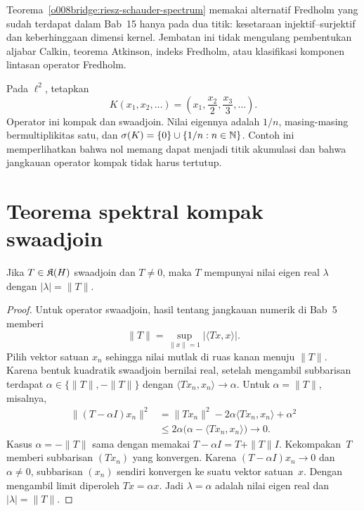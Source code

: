 \begin{rem}\label{o008bridge:no-fredholm-duplication}
Teorema~\ref{o008bridge:riesz-schauder-spectrum} memakai alternatif Fredholm
yang sudah terdapat dalam Bab~15 hanya pada dua titik: kesetaraan
injektif--surjektif dan keberhinggaan dimensi kernel. Jembatan ini tidak
mengulang pembentukan aljabar Calkin, teorema Atkinson, indeks Fredholm, atau
klasifikasi komponen lintasan operator Fredholm.
\end{rem}

\begin{exam}\label{o008bridge:diagonal-compact-example}
Pada $\ell^2$, tetapkan
\[
 K(x_1,x_2,\ldots)=
   \left(x_1,\frac{x_2}{2},\frac{x_3}{3},\ldots\right).
\]
Operator ini kompak dan swaadjoin. Nilai eigennya adalah $1/n$, masing-masing
bermultiplikitas satu, dan
$\sigma(K)=\{0\}\cup\{1/n:n\in\mathbb{N}\}$. Contoh ini memperlihatkan bahwa nol
memang dapat menjadi titik akumulasi dan bahwa jangkauan operator kompak tidak
harus tertutup.
\end{exam}

\section{Teorema spektral kompak swaadjoin}

\begin{lem}\label{o008bridge:max-eigenvalue}
Jika $T\in\mathfrak{K}(H)$ swaadjoin dan $T\neq0$, maka $T$ mempunyai nilai eigen
real $\lambda$ dengan $|\lambda|=\|T\|$.
\end{lem}

\begin{proof}
Untuk operator swaadjoin, hasil tentang jangkauan numerik di Bab~5 memberi
\[
 \|T\|=\sup_{\|x\|=1}|\langle Tx,x\rangle|.
\]
Pilih vektor satuan $x_n$ sehingga nilai mutlak di ruas kanan menuju
$\|T\|$. Karena bentuk kuadratik swaadjoin bernilai real, setelah mengambil
subbarisan terdapat $\alpha\in\{\|T\|,-\|T\|\}$ dengan
$\langle Tx_n,x_n\rangle\to\alpha$. Untuk $\alpha=\|T\|$, misalnya,
\begin{align*}
 \|(T-\alpha I)x_n\|^2
 &=\|Tx_n\|^2-2\alpha\langle Tx_n,x_n\rangle+\alpha^2\\
 &\leq2\alpha\bigl(\alpha-\langle Tx_n,x_n\rangle\bigr)
 \longrightarrow0.
\end{align*}
Kasus $\alpha=-\|T\|$ sama dengan memakai $T-\alpha I=T+\|T\|I$.
Kekompakan~$T$ memberi subbarisan $(Tx_n)$ yang konvergen. Karena
$(T-\alpha I)x_n\to0$ dan $\alpha\neq0$, subbarisan $(x_n)$ sendiri
konvergen ke suatu vektor satuan~$x$. Dengan mengambil limit diperoleh
$Tx=\alpha x$. Jadi $\lambda=\alpha$ adalah nilai eigen real dan
$|\lambda|=\|T\|$.
\end{proof}

